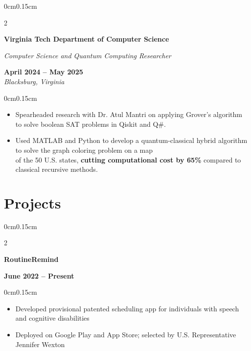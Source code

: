 \documentclass[10pt, letterpaper]{article}
\newenvironment{highlights}{
    \begin{itemize}[topsep=0pt, parsep=0pt, partopsep=0pt, itemsep=0pt, leftmargin=0.6cm]
}{
    \end{itemize}
}
\newenvironment{onecolentry}{
    \begin{adjustwidth}{0cm}{0.15cm}
}{
    \end{adjustwidth}
}
\newenvironment{twocolentry}[2][]{
    \onecolentry
    \def\secondColumn{#2}
    \setcolumnwidth{\fill, 4cm}
    \begin{paracol}{2}
}{
    \switchcolumn \raggedleft \secondColumn
    \end{paracol}
    \endonecolentry
}
\begin{document}
    \vspace{0.05cm}

    \begin{twocolentry}{\textbf{April 2024 -- May 2025} \\ \textit{Blacksburg, Virginia}}
        \textbf{Virginia Tech Department of Computer Science}
        
        \textit{Computer Science and Quantum Computing Researcher}
    \end{twocolentry}
    \vspace{-0.1cm}
    \begin{onecolentry}
        \begin{highlights}
            \item Spearheaded research with Dr. Atul Mantri on applying Grover's algorithm to solve boolean SAT problems in Qiskit and Q\#.
            \item Used MATLAB and Python to develop a quantum-classical hybrid algorithm to solve the graph coloring problem on a map \\ of the 50 U.S. states, \textbf{cutting computational cost by 65\%} compared to classical recursive methods.
        \end{highlights}
    \end{onecolentry}

    \vspace{0.05cm}

    \section{Projects}
    \vspace{0.1cm}

    \begin{twocolentry}{\textbf{June 2022 -- Present}}
        \textbf{RoutineRemind}
    \end{twocolentry}
    \vspace{-0.1cm}
    \begin{onecolentry}
        \begin{highlights}
            \item Developed provisional patented scheduling app for individuals with speech and cognitive disabilities
            \item Deployed on Google Play and App Store; selected by U.S. Representative Jennifer Wexton
        \end{highlights}
    \end{onecolentry}
\end{document}
